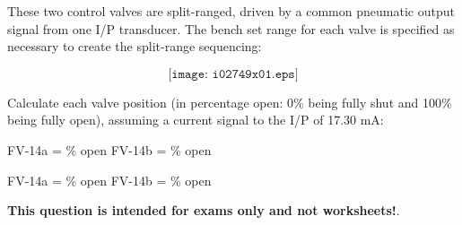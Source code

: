 

These two control valves are split-ranged, driven by a common pneumatic output signal from one I/P transducer.  The bench set range for each valve is specified as necessary to create the split-range sequencing:

$$\texttt{[image: i02749x01.eps]}$$

Calculate each valve position (in percentage open: 0\% being fully shut and 100\% being fully open), assuming a current signal to the I/P of 17.30 mA:

\vskip 20pt

\hskip 50pt FV-14a = \underbar{\hskip 50pt} \% open \hskip 60pt FV-14b = \underbar{\hskip 50pt} \% open







FV-14a =  \% open \hskip 100pt FV-14b =  \% open







{\bf This question is intended for exams only and not worksheets!}.



